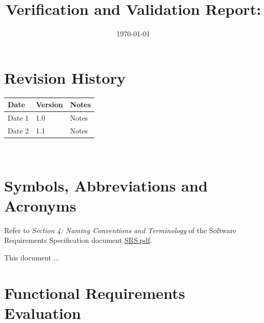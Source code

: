 \documentclass[12pt, titlepage]{article}
\begin{document}
\title{Verification and Validation Report: \progname}
\author{\authname}
\date{\today}

\maketitle


\section{Revision History}

\begin{tabularx}{\textwidth}{p{3cm}p{2cm}X}
  \toprule {\bf Date} & {\bf Version} & {\bf Notes}\\
  \midrule
  Date 1 & 1.0 & Notes\\
  Date 2 & 1.1 & Notes\\
  \bottomrule
\end{tabularx}

~\newpage

\section{Symbols, Abbreviations and Acronyms}

Refer to \textit{Section 4: Naming Conventions and Terminology} of
the Software Requirements Specification document
\href{https://github.com/Spitgranger/SyncMaster/blob/main/docs/SRS-Volere/SRS.pdf}{SRS.pdf}.

\newpage

\tableofcontents

\listoftables %

\listoffigures %

\newpage


This document ...

\section{Functional Requirements Evaluation}
\end{document}
